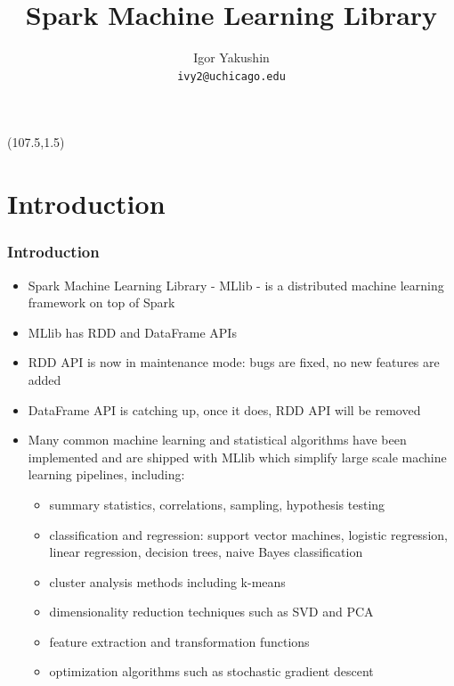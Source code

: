 \documentclass{beamer}
\title{\huge{Spark Machine Learning Library}}
\author{Igor Yakushin \\ \texttt{ivy2@uchicago.edu}}
\date{}
\newcommand{\SPARK}{
\begin{textblock}{14}(107.5,1.5)
  \pgfuseimage{spark}
\end{textblock}
}
\begin{document}



\begin{frame}
\SPARK
\titlepage
\end{frame}

\section{Introduction}
\begin{frame}[fragile]
\frametitle{Introduction}
\begin{itemize}
\item Spark Machine Learning Library - {\color{mycolordef}MLlib} - is a distributed machine learning framework on top of Spark
\item MLlib has RDD and DataFrame APIs
\item RDD API is now in maintenance mode: bugs are fixed, no new features are added
\item DataFrame API is catching up, once it does, RDD API will be removed
\item Many common machine learning and statistical algorithms have been implemented and are shipped with MLlib which simplify large scale machine learning pipelines, including:
  \begin{itemize}
    \item summary statistics, correlations, sampling, hypothesis testing
    \item classification and regression: support vector machines, logistic regression, linear regression, decision trees, naive Bayes classification
    \item cluster analysis methods including k-means
    \item dimensionality reduction techniques such as SVD and PCA
    \item feature extraction and transformation functions
    \item optimization algorithms such as stochastic gradient descent
  \end{itemize}
\end{itemize}
\end{frame}
\end{document}
